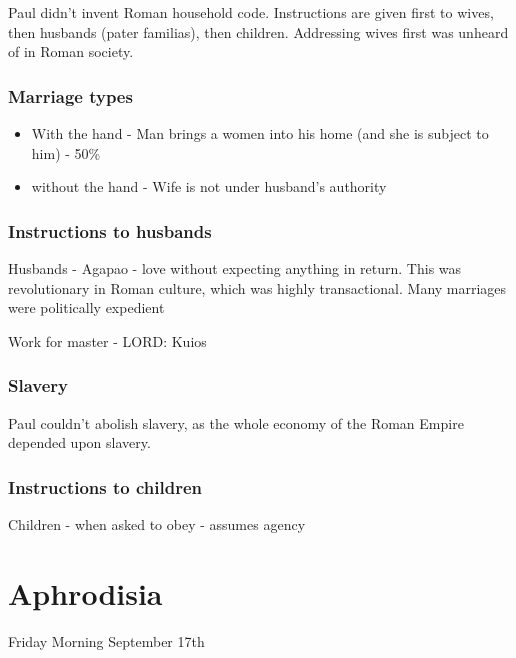 \documentclass[
]{book}
\providecommand{\tightlist}{%
  \setlength{\itemsep}{0pt}\setlength{\parskip}{0pt}}
\begin{document}
Paul didn't invent Roman household code. Instructions are given first to wives, then husbands (pater familias), then children. Addressing wives first was unheard of in Roman society.

\hypertarget{marriage-types}{%
\subsection{Marriage types}\label{marriage-types}}

\begin{itemize}
\tightlist
\item
  With the hand - Man brings a women into his home (and she is subject to him) - 50\%
\item
  without the hand - Wife is not under husband's authority
\end{itemize}

\hypertarget{instructions-to-husbands}{%
\subsection{Instructions to husbands}\label{instructions-to-husbands}}

Husbands - Agapao - love without expecting anything in return. This was revolutionary in Roman culture, which was highly transactional. Many marriages were politically expedient

Work for master - LORD: Kuios

\hypertarget{slavery}{%
\subsection{Slavery}\label{slavery}}

Paul couldn't abolish slavery, as the whole economy of the Roman Empire depended upon slavery.

\hypertarget{instructions-to-children}{%
\subsection{Instructions to children}\label{instructions-to-children}}

Children - when asked to obey - assumes agency

\hypertarget{aphrodisia}{%
\chapter{Aphrodisia}\label{aphrodisia}}

Friday Morning September 17th
\end{document}
